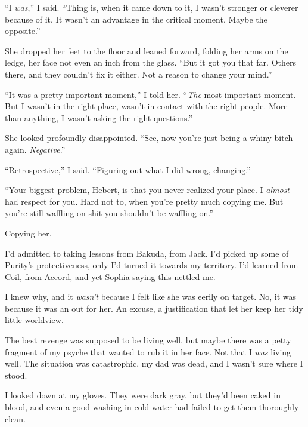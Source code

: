 ``I \emph{was},'' I said.  ``Thing is, when it came down to it, I wasn't stronger or cleverer because of it.  It wasn't an advantage in the critical moment.  Maybe the opposite.''



She dropped her feet to the floor and leaned forward, folding her arms on the ledge, her face not even an inch from the glass.  ``But it got you that far.  Others there, and they couldn't fix it either.  Not a reason to change your mind.''



``It was a pretty important moment,'' I told her.  ``\emph{The} most important moment.  But I wasn't in the right place, wasn't in contact with the right people.  More than anything, I wasn't asking the right questions.''



She looked profoundly disappointed.  ``See, now you're just being a whiny bitch again.  \emph{Negative}.''



``Retrospective,'' I said.  ``Figuring out what I did wrong, changing.''



``Your biggest problem, Hebert, is that you never realized your place.  I \emph{almost} had respect for you.  Hard not to, when you're pretty much copying me.  But you're still waffling on shit you shouldn't be waffling on.''



Copying her.



I'd admitted to taking lessons from Bakuda, from Jack.  I'd picked up some of Purity's protectiveness, only I'd turned it towards my territory.  I'd learned from Coil, from Accord, and yet Sophia saying this nettled me.



I knew why, and it \emph{wasn't} because I felt like she was eerily on target.  No, it was because it was an out for her.  An excuse, a justification that let her keep her tidy little worldview.



The best revenge was supposed to be living well, but maybe there was a petty fragment of my psyche that wanted to rub it in her face.  Not that I \emph{was} living well.  The situation was catastrophic, my dad was dead, and I wasn't sure where I stood.



I looked down at my gloves.  They were dark gray, but they'd been caked in blood, and even a good washing in cold water had failed to get them thoroughly clean.



